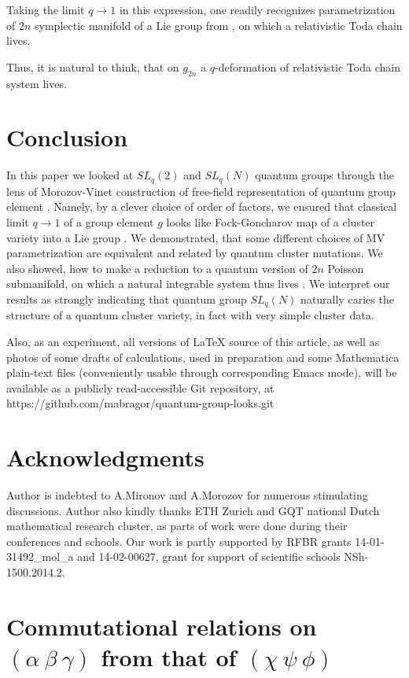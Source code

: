 \documentclass{article}
\newcommand {\?}{\textit{???}}
\def\classlim{q \rightarrow 1}
\begin{document}
Taking the limit $\classlim$ in this expression, one readily recognizes
parametrization of $2n$ symplectic manifold of a Lie group from \cite{Mars1},
on which a relativistic Toda chain lives.


Thus, it is natural to think, that on $g_{2n}$ a $q$-deformation of relativistic Toda chain
system lives.

\section{Conclusion}
In this paper we looked at $SL_q(2)$ and $SL_q(N)$ quantum groups through
the lens of Morozov-Vinet construction of free-field representation of
quantum group element \cite{MV1}. Namely, by a clever choice of order of factors, we
ensured that classical limit $\classlim$ of a group element $g$ looks like
Fock-Goncharov map of a cluster variety into a Lie group \cite{FG2}.
We demonstrated, that some different choices of MV parametrization are equivalent
and related by quantum cluster mutations.
We also showed, how to make a reduction to a quantum version of $2n$ Poisson submanifold,
on which a natural integrable system thus lives \cite{Mars1}.
We interpret our results as strongly indicating that quantum group $SL_q(N)$ naturally
caries the structure of a quantum cluster variety, in fact with very simple cluster data.

Also, as an experiment, all versions of LaTeX source of this article, as well as
photos of some drafts of calculations, used in preparation
and some Mathematica plain-text files (conveniently usable through corresponding Emacs mode), will be available as
a publicly read-accessible Git repository, at
\\ https://github.com/mabragor/quantum-group-looks.git


\section*{Acknowledgments}

Author is indebted to A.Mironov and A.Morozov for numerous stimulating discussions.
Author also kindly thanks ETH Zurich and GQT national Dutch mathematical research cluster,
as parts of work were done during their conferences and schools.
Our work is partly supported by RFBR grants 14-01-31492\_mol\_a and 14-02-00627,
 grant for support of scientific schools NSh-1500.2014.2.

\appendix

\section{Commutational relations on $(\alpha\ \beta\ \gamma)$ from that of $(\chi\ \psi\ \phi)$}
\label{sec:alpha-beta-gamma-from-chi-psi-phi}
\end{document}
